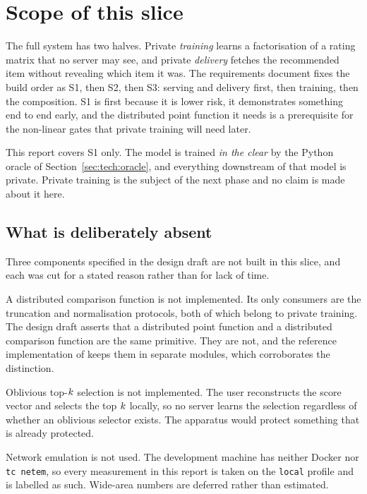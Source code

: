 \section{Scope of this slice}
\label{sec:tech:scope}

The full system has two halves. Private \emph{training} learns a
factorisation of a rating matrix that no server may see, and private
\emph{delivery} fetches the recommended item without revealing which item it
was. The requirements document fixes the build order as S1, then S2, then
S3: serving and delivery first, then training, then the composition. S1 is
first because it is lower risk, it demonstrates something end to end early,
and the distributed point function it needs is a prerequisite for the
non-linear gates that private training will need later.

This report covers S1 only. The model is trained \emph{in the clear} by the
Python oracle of Section~\ref{sec:tech:oracle}, and everything downstream of
that model is private. Private training is the subject of the next phase and
no claim is made about it here.

\subsection{What is deliberately absent}
\label{sec:tech:scope:absent}

Three components specified in the design draft are not built in this slice,
and each was cut for a stated reason rather than for lack of time.

A distributed comparison function is not implemented. Its only consumers are
the truncation and normalisation protocols, both of which belong to private
training. The design draft asserts that a distributed point function and a
distributed comparison function are the same primitive. They are not, and the
reference implementation of \nudgeplain{} keeps them in separate modules,
which corroborates the distinction.

Oblivious top-$k$ selection is not implemented. The user reconstructs the
score vector and selects the top $k$ locally, so no server learns the
selection regardless of whether an oblivious selector exists. The apparatus
would protect something that is already protected.

Network emulation is not used. The development machine has neither Docker nor
\texttt{tc netem}, so every measurement in this report is taken on the
\texttt{local} profile and is labelled as such. Wide-area numbers are
deferred rather than estimated.

